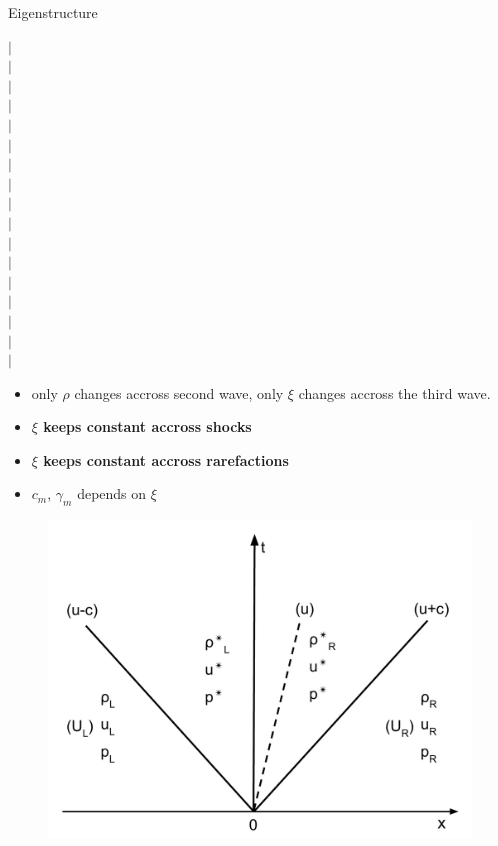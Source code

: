 \documentclass{beamer}
\begin{document}
\begin{frame}{Eigenstructure}
\begin{minipage}{.54\textwidth}
\end{minipage}
\begin{minipage}{.01\textwidth}
$\vert$\\
$\vert$\\
$\vert$\\
$\vert$\\
$\vert$\\
$\vert$\\
$\vert$\\
$\vert$\\
$\vert$\\
$\vert$\\
$\vert$\\
$\vert$\\
$\vert$\\
$\vert$\\
$\vert$\\
$\vert$\\
$\vert$\\
\end{minipage}
\begin{minipage}{.43\textwidth}
\begin{itemize}
\item only $\rho$ changes accross second wave, only $\xi$ changes accross the third wave.
\item \textbf{$\xi$ keeps constant accross shocks}
\item \textbf{$\xi$ keeps constant accross rarefactions}
\item $c_m$, $\gamma_m$ depends on $\xi$
\end{itemize} 
\begin{figure}
\centering
\includegraphics[width=.80\textwidth]{./Chapter-2/Figures/Solution_Structure_RP_simplified}
\label{fig:Domain_3D}
\end{figure}
\end{minipage}
%
\end{frame}
\end{document}
